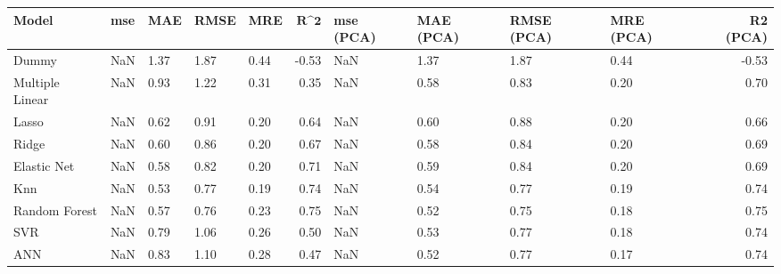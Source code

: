 \begin{table}
\centering
\label{table:iri_reg_pred}
\begin{tabular}{lllllrllllr}
\toprule
 \textbf{Model} & \textbf{mse} & \textbf{MAE} & \textbf{RMSE} & \textbf{MRE} & $\textbf{R^2}$ & \textbf{mse (PCA)} & \textbf{MAE (PCA)} & \textbf{RMSE (PCA)} & \textbf{MRE (PCA)} & \textbf{R2 (PCA)} \\
\midrule
          Dummy &          NaN &         1.37 &          1.87 &         0.44 &          -0.53 &                NaN &               1.37 &                1.87 &               0.44 &             -0.53 \\
Multiple Linear &          NaN &         0.93 &          1.22 &         0.31 &           0.35 &                NaN &               0.58 &                0.83 &               0.20 &              0.70 \\
          Lasso &          NaN &         0.62 &          0.91 &         0.20 &           0.64 &                NaN &               0.60 &                0.88 &               0.20 &              0.66 \\
          Ridge &          NaN &         0.60 &          0.86 &         0.20 &           0.67 &                NaN &               0.58 &                0.84 &               0.20 &              0.69 \\
    Elastic Net &          NaN &         0.58 &          0.82 &         0.20 &           0.71 &                NaN &               0.59 &                0.84 &               0.20 &              0.69 \\
            Knn &          NaN &         0.53 &          0.77 &         0.19 &           0.74 &                NaN &               0.54 &                0.77 &               0.19 &              0.74 \\
  Random Forest &          NaN &         0.57 &          0.76 &         0.23 &           0.75 &                NaN &               0.52 &                0.75 &               0.18 &              0.75 \\
            SVR &          NaN &         0.79 &          1.06 &         0.26 &           0.50 &                NaN &               0.53 &                0.77 &               0.18 &              0.74 \\
            ANN &          NaN &         0.83 &          1.10 &         0.28 &           0.47 &                NaN &               0.52 &                0.77 &               0.17 &              0.74 \\
\bottomrule
\end{tabular}
\end{table}
